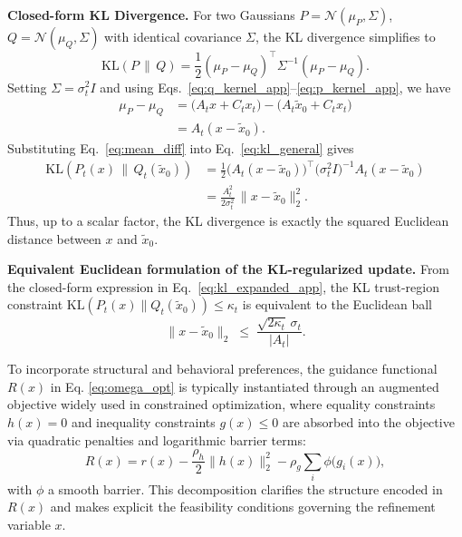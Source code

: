\documentclass[10pt,twocolumn,letterpaper]{article}
\theoremstyle{plain}
\theoremstyle{remark}
\renewcommand{\paragraph}[1]{\vspace{.5em}\noindent\textbf{#1.}}
\begin{document}
\paragraph{Closed-form KL Divergence}
For two Gaussians
\(P = \mathcal{N}(\mu_P,\Sigma)\),
\(Q = \mathcal{N}(\mu_Q,\Sigma)\)
with identical covariance \(\Sigma\),
the KL divergence simplifies to
\begin{equation}
\mathrm{KL}(P \,\|\, Q)
=
\frac{1}{2}
(\mu_P - \mu_Q)^{\top}
\Sigma^{-1}
(\mu_P - \mu_Q).
\label{eq:kl_general}
\end{equation}
Setting \(\Sigma = \sigma_t^2 I\) and using
Eqs.~\eqref{eq:q_kernel_app}–\eqref{eq:p_kernel_app},
we have
\begin{align}
\mu_P - \mu_Q
&=
\bigl(A_t x + C_t x_t\bigr)
-
\bigl(A_t \tilde{x}_0 + C_t x_t\bigr)
\nonumber \\
&=
A_t (x - \tilde{x}_0).
\label{eq:mean_diff}
\end{align}
Substituting Eq.~\eqref{eq:mean_diff} into
Eq.~\eqref{eq:kl_general} gives
\begin{align}
\mathrm{KL}\!\left(
P_t(x)\,\|\,Q_t(\tilde{x}_0)
\right)
&=
\frac{1}{2}
\bigl(A_t (x - \tilde{x}_0)\bigr)^{\top}
\bigl(\sigma_t^2 I\bigr)^{-1}
A_t (x - \tilde{x}_0)
\nonumber \\
&=
\frac{A_t^2}{2\sigma_t^2}
\,
\|x - \tilde{x}_0\|_2^2.
\label{eq:kl_expanded_app}
\end{align}
Thus, up to a scalar factor, the KL divergence is exactly
the squared Euclidean distance between \(x\) and
\(\tilde{x}_0\).

\vspace{3pt}
\paragraph{Equivalent Euclidean formulation of the KL-regularized update}
From the closed-form expression in Eq.~\eqref{eq:kl_expanded_app},
the KL trust-region constraint
\(\mathrm{KL}(P_t(x)\|Q_t(\tilde{x}_0))\le\kappa_t\)
is equivalent to the Euclidean ball
\begin{equation}
\|x-\tilde{x}_0\|_2
\;\le\;
\frac{\sqrt{2\kappa_t}\,\sigma_t}{|A_t|}.
\label{eq:euclidean_tr_app}
\end{equation}

To incorporate structural and behavioral preferences,
the guidance functional \(R(x)\) in Eq. \eqref{eq:omega_opt} is typically instantiated
through an augmented objective widely used in constrained
optimization, where equality constraints
\(h(x)=0\) and inequality constraints \(g(x)\le0\) are absorbed
into the objective via quadratic penalties and logarithmic
barrier terms:
\begin{equation}
R(x)
=
r(x)
-
\frac{\rho_h}{2}\|h(x)\|_2^2
-
\rho_g \sum_i \phi\!\bigl(g_i(x)\bigr),
\label{eq:augmented_R_app}
\end{equation}
with \(\phi\) a smooth barrier.  
This decomposition clarifies the structure encoded in
\(R(x)\) and makes explicit the feasibility conditions
governing the refinement variable \(x\).
\end{document}
